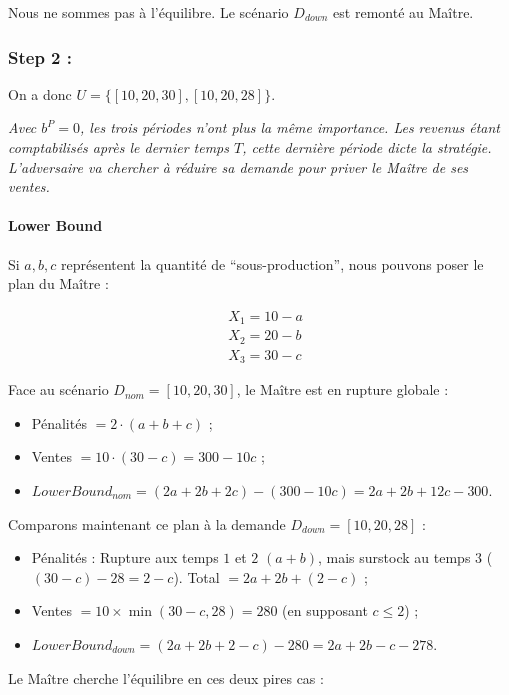 Nous ne sommes pas à l'équilibre. Le scénario $D_{down}$ est remonté au Maître.

\subsubsection{Step 2 :}

On a donc $U=\{[10, 20, 30], [10, 20, 28]\}$.

\textit{Avec $b^P=0$,  les trois périodes n'ont plus la même importance. Les revenus étant comptabilisés après le dernier temps $T$, cette dernière période dicte la stratégie. L'adversaire va chercher à réduire sa demande pour priver le Maître de ses ventes.}

\paragraph{Lower Bound}

Si $a, b, c$ représentent la quantité de \enquote{sous-production}, nous pouvons poser le plan du Maître :

\begin{align}
    &X_1=10-a\\
    &X_2=20-b\\
    &X_3=30-c
\end{align}

Face au scénario $D_{nom}=[10, 20, 30]$, le Maître est en rupture globale :

\begin{itemize}
    \item Pénalités $=2\cdot(a+b+c)$ ;
    \item Ventes $=10\cdot(30-c)=300-10c$ ;
    \item $LowerBound_{nom}=(2a+2b+2c)-(300-10c)=2a+2b+12c-300$.
\end{itemize}

Comparons maintenant ce plan à la demande $D_{down}=[10, 20, 28]$ :

\begin{itemize}
    \item Pénalités : Rupture aux temps $1$ et $2$ $(a+b)$, mais surstock au temps $3$ ($(30-c)-28=2-c$). Total $=2a+2b+(2-c)$ ;
    \item Ventes $=10\times\min(30-c, 28)=280$ (en supposant $c\leq2$) ;
    \item $LowerBound_{down}=(2a+2b+2-c)-280=2a+2b-c-278$.
\end{itemize}

Le Maître cherche l'équilibre en ces deux pires cas :

